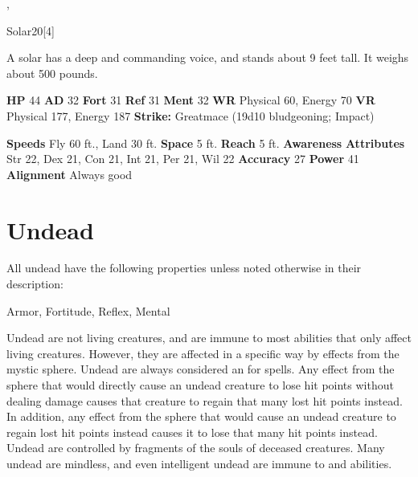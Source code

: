   ,
  \begin{monsubsection}{Solar}{20}[4]
    \vspace{-1em}\vspace{-1em}
    \vspace{0em}

    
          A solar has a deep and commanding voice, and stands about 9 feet tall. It weighs about 500 pounds.
        
    

    \begin{spellcontent}
      \begin{spelltargetinginfo}
        \pari \textbf{HP} 44 \monsep
          \textbf{AD} 32 \monsep
          \textbf{Fort} 31 \monsep
          \textbf{Ref} 31 \monsep
          \textbf{Ment} 32
        \pari \textbf{WR} Physical 60, Energy 70 \monsep
        \textbf{VR} Physical 177, Energy 187
        \pari \textbf{Strike:}
            Greatmace  (19d10 bludgeoning; Impact)
      \end{spelltargetinginfo}
    \end{spellcontent}
    \begin{monsterfooter}
      \pari \textbf{Speeds} Fly 60 ft., Land 30 ft. \monsep
        \textbf{Space} 5 ft. \monsep
        \textbf{Reach} 5 ft.
      \pari \textbf{Awareness} 
      \pari \textbf{Attributes}
        Str 22, Dex 21,
        Con 21, Int 21,
        Per 21, Wil 22
      \pari \textbf{Accuracy} 27 \monsep
        \textbf{Power} 41
      \pari \textbf{Alignment} Always good
    \end{monsterfooter}
  \end{monsubsection}
  
  
  
        \section{Undead}

        All undead have the following properties unless noted otherwise in their description:
        
    
     Armor,
     Fortitude,
     Reflex,
     Mental
  
     Undead are not living creatures, and are immune to most abilities that only affect living creatures.
    However, they are affected in a specific way by effects from the  mystic sphere.
    Undead are always considered an  for  spells.
    Any effect from the  sphere that would directly cause an undead creature to lose hit points without dealing damage causes that creature to regain that many lost hit points instead.
    In addition, any effect from the  sphere that would cause an undead creature to regain lost hit points instead causes it to lose that many hit points instead.
     Undead are controlled by fragments of the souls of deceased creatures.
    Many undead are mindless, and even intelligent undead are immune to  and  abilities.
  
